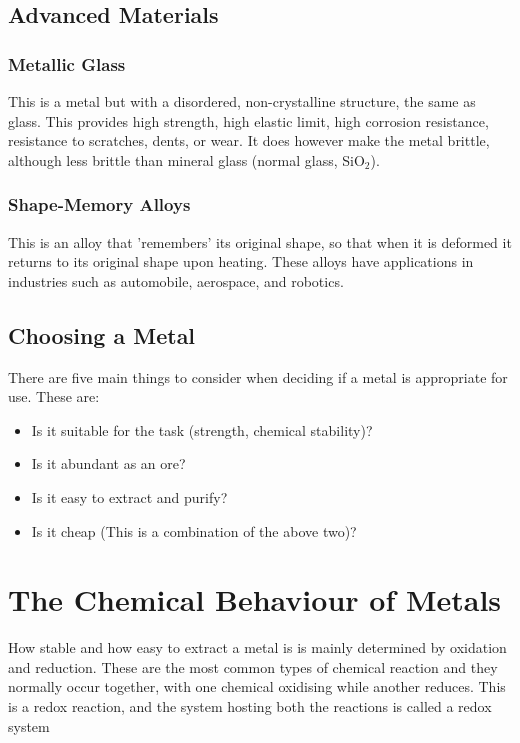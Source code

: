 \documentclass[a4paper, 12pt]{article}
\begin{document}
		\subsection{Advanced Materials}
			\subsubsection*{Metallic Glass}
				This is a metal but with a disordered, non-crystalline structure, the same as glass. This provides high strength, high elastic limit, high corrosion resistance, resistance to scratches, dents, or wear. It does however make the metal brittle, although less brittle than mineral glass (normal glass, SiO$_2$).
			\subsubsection*{Shape-Memory Alloys}
				This is an alloy that 'remembers' its original shape, so that when it is deformed it returns to its original shape upon heating. These alloys have applications in industries such as automobile, aerospace, and robotics.
		
		\subsection{Choosing a Metal}
			There are five main things to consider when deciding if a metal is appropriate for use. These are:
			\begin{itemize}
				\item Is it suitable for the task (strength, chemical stability)? 
				\item Is it abundant as an ore?
				\item Is it easy to extract and purify?
				\item Is it cheap (This is a combination of the above two)?
			\end{itemize}			
						
	\newpage
	
	\section{The Chemical Behaviour of Metals}
		How stable and how easy to extract a metal is is mainly determined by oxidation and reduction. These are the most common types of chemical reaction and they normally occur together, with one chemical oxidising while another reduces. This is a redox reaction, and the system hosting both the reactions is called a redox system
		
\end{document}
